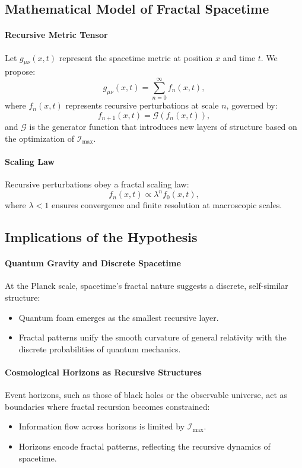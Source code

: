 \documentclass[12pt]{article}
\begin{document}
\subsection{Mathematical Model of Fractal Spacetime}

\paragraph{Recursive Metric Tensor}
Let \(g_{\mu\nu}(x, t)\) represent the spacetime metric at position \(x\) and time \(t\). We propose:
\[
g_{\mu\nu}(x, t) = \sum_{n=0}^\infty f_n(x, t),
\]
where \(f_n(x, t)\) represents recursive perturbations at scale \(n\), governed by:
\[
f_{n+1}(x, t) = \mathcal{G}(f_n(x, t)),
\]
and \(\mathcal{G}\) is the generator function that introduces new layers of structure based on the optimization of \(\mathcal{I}_{\text{max}}\).

\paragraph{Scaling Law}
Recursive perturbations obey a fractal scaling law:
\[
f_n(x, t) \propto \lambda^n f_0(x, t),
\]
where \(\lambda < 1\) ensures convergence and finite resolution at macroscopic scales.

\subsection{Implications of the Hypothesis}

\paragraph{Quantum Gravity and Discrete Spacetime}
At the Planck scale, spacetime’s fractal nature suggests a discrete, self-similar structure:
\begin{itemize}
    \item Quantum foam emerges as the smallest recursive layer.
    \item Fractal patterns unify the smooth curvature of general relativity with the discrete probabilities of quantum mechanics.
\end{itemize}

\paragraph{Cosmological Horizons as Recursive Structures}
Event horizons, such as those of black holes or the observable universe, act as boundaries where fractal recursion becomes constrained:
\begin{itemize}
    \item Information flow across horizons is limited by \(\mathcal{I}_{\text{max}}\).
    \item Horizons encode fractal patterns, reflecting the recursive dynamics of spacetime.
\end{itemize}
\end{document}
